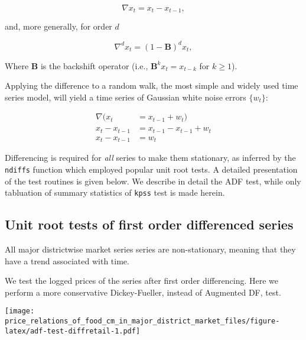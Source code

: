 \documentclass[
  12pt,
]{article}
\begin{document}
\begin{equation}
\nabla x_t = x_t - x_{t-1},
\label{eqn:difference-operator}
\end{equation}

and, more generally, for order \(d\)

\begin{equation}
\nabla^d x_t = (1-\mathbf{B})^d x_t,
\label{eqn:order-d-difference-operator}
\end{equation}

Where \(\mathbf{B}\) is the backshift operator (i.e., \(\mathbf{B}^k x_t = x_{t-k}\) for \(k \geq 1\)).

Applying the difference to a random walk, the most simple and widely used time series model, will yield a time series of Gaussian white noise errors \(\{w_t\}\):

\begin{equation}
  \begin{aligned}
    \nabla (x_t &= x_{t-1} + w_t) \\
    x_t - x_{t-1} &= x_{t-1} - x_{t-1} + w_t \\
    x_t - x_{t-1} &= w_t
  \end{aligned}
  \label{eqn:random-walk-series}
\end{equation}

Differencing is required for \emph{all} series to make them stationary, as inferred by the \texttt{ndiffs} function which employed popular unit root tests. A detailed presentation of the test routines is given below. We describe in detail the ADF test, while only tabluation of summary statistics of \texttt{kpss} test is made herein.

\hypertarget{unit-root-tests-of-first-order-differenced-series}{%
\subsection{Unit root tests of first order differenced series}\label{unit-root-tests-of-first-order-differenced-series}}

All major districtwise market series series are non-stationary, meaning that they have a trend associated with time.

We test the logged prices of the series after first order differencing. Here we perform a more conservative Dickey-Fueller, instead of Augmented DF, test.

\texttt{[image: price\_relations\_of\_food\_cm\_in\_major\_district\_market\_files/figure-latex/adf-test-diffretail-1.pdf]}
\end{document}
